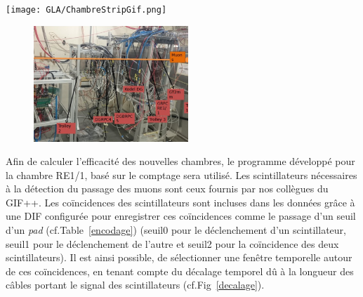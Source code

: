 \marginpar
{
	\centering
	\texttt{[image: GLA/ChambreStripGif.png]}
	\label{nouvellestrip}
}
\vspace*{-0.2cm}
\begin{figure}[ht!]
	\centering
	\includegraphics[width=0.52\textwidth]{GLA/setup.png}
	\label{bati}
\end{figure}
\vspace*{-0.2cm}
Afin de calculer l'efficacité des nouvelles chambres, le programme développé pour la chambre RE1/1, basé sur le comptage sera utilisé. Les scintillateurs nécessaires à la détection du passage des muons sont ceux fournis par nos collègues du GIF++. Les coïncidences des scintillateurs sont incluses dans les données grâce à une DIF configurée pour enregistrer ces coïncidences comme le passage d'un seuil d'un \textit{pad} (cf.Table~\ref{encodage}) (seuil0 pour le déclenchement d'un scintillateur, seuil1 pour le déclenchement de l'autre et seuil2 pour la coïncidence des deux scintillateurs). Il est ainsi possible, de sélectionner une fenêtre temporelle autour de ces coïncidences, en tenant compte du décalage temporel dû à la longueur des câbles portant le signal des scintillateurs (cf.Fig~\ref{decalage}). 


